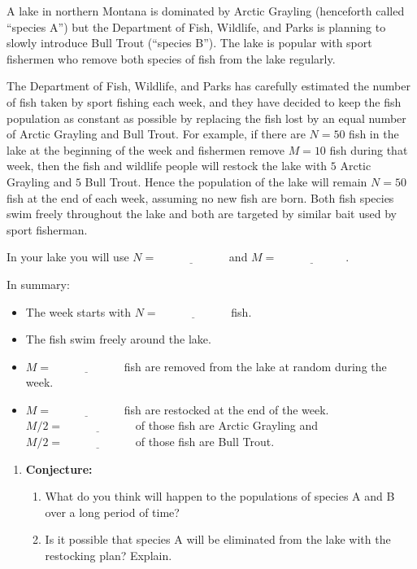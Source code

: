 \begin{lab}
A lake in northern Montana is dominated by Arctic Grayling (henceforth called ``species
A'') but the Department of Fish, Wildlife, and Parks is planning to slowly introduce Bull
Trout (``species B'').  The lake is popular with sport fishermen who remove both species of
fish from the lake regularly.

The Department of Fish, Wildlife, and Parks has carefully estimated the number of fish
taken by sport fishing each week, and they have decided to keep the fish population as
constant as possible by replacing the fish lost by an equal number of Arctic Grayling and
Bull Trout.  For example, if there are $N=50$ fish in the lake at the beginning of the
week and fishermen remove $M=10$ fish during that week, then the fish and wildlife people
will restock the lake with $5$ Arctic Grayling and $5$ Bull Trout. Hence the population of
the lake will remain $N=50$ fish at the end of each week, assuming no new fish are born.  Both fish species swim freely
throughout the lake and both are targeted by similar bait used by sport fisherman.

In your lake you will use $N = \underline{\hspace{1in}}$ and $M =
\underline{\hspace{1in}}$. 


In summary:
\begin{itemize}
    \item The week starts with $N=\underline{\hspace{1in}}$ fish.
    \item The fish swim freely around the lake.
    \item $M=\underline{\hspace{1in}}$ fish are removed from the lake at random during the week.
    \item $M=\underline{\hspace{1in}}$ fish are restocked at the end of the week.  $M/2=\underline{\hspace{1in}}$ of those fish are Arctic
        Grayling and $M/2=\underline{\hspace{1in}}$ of those fish are Bull Trout.
\end{itemize}


\begin{enumerate}
    \item {\bf Conjecture:}
        \begin{enumerate}
            \item What do you think will happen to the populations of species A and B over
                a long period of time?
            \item Is it possible that species A will be eliminated from the lake with the
                restocking plan? Explain.
        \end{enumerate}


\end{enumerate}
\end{lab}
